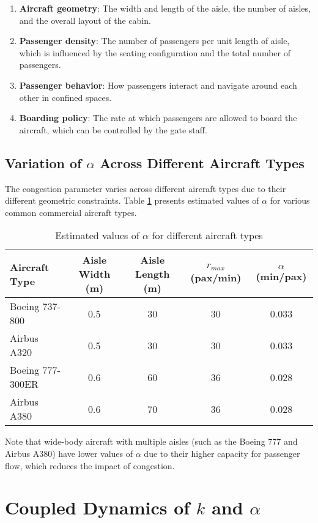 \documentclass[12pt,a4paper]{article}
\begin{document}
\begin{enumerate}
    \item \textbf{Aircraft geometry}: The width and length of the aisle, the number of aisles, and the overall layout of the cabin.
    \item \textbf{Passenger density}: The number of passengers per unit length of aisle, which is influenced by the seating configuration and the total number of passengers.
    \item \textbf{Passenger behavior}: How passengers interact and navigate around each other in confined spaces.
    \item \textbf{Boarding policy}: The rate at which passengers are allowed to board the aircraft, which can be controlled by the gate staff.
\end{enumerate}

\subsection{Variation of $\alpha$ Across Different Aircraft Types}

The congestion parameter varies across different aircraft types due to their different geometric constraints. Table \ref{tab:alpha_values} presents estimated values of $\alpha$ for various common commercial aircraft types.

\begin{table}[H]
\centering
\begin{tabular}{|l|c|c|c|c|}
\hline
\textbf{Aircraft Type} & \textbf{Aisle Width (m)} & \textbf{Aisle Length (m)} & \textbf{$r_{max}$ (pax/min)} & \textbf{$\alpha$ (min/pax)} \\ \hline
Boeing 737-800 & 0.5 & 30 & 30 & 0.033 \\ \hline
Airbus A320 & 0.5 & 30 & 30 & 0.033 \\ \hline
Boeing 777-300ER & 0.6 & 60 & 36 & 0.028 \\ \hline
Airbus A380 & 0.6 & 70 & 36 & 0.028 \\ \hline
\end{tabular}
\caption{Estimated values of $\alpha$ for different aircraft types}
\label{tab:alpha_values}
\end{table}

Note that wide-body aircraft with multiple aisles (such as the Boeing 777 and Airbus A380) have lower values of $\alpha$ due to their higher capacity for passenger flow, which reduces the impact of congestion.

\section{Coupled Dynamics of $k$ and $\alpha$}
\end{document}
